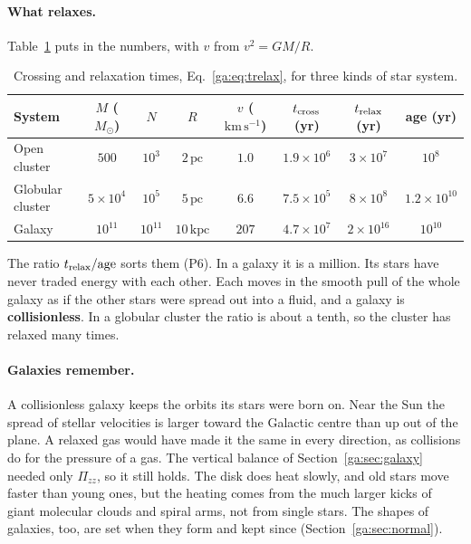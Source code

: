 \paragraph{What relaxes.} Table~\ref{ga:tab:relax} puts in the numbers, with $v$ from $v^2=GM/R$.
\begin{table}[htbp]
	\centering
	\begin{tabular}{@{}l c c c c c c c@{}}
		\toprule
		\textbf{System} & $M$ ($M_\odot$) & $N$ & $R$ & $v$ ($\mathrm{km\,s^{-1}}$) & $t_{\rm cross}$ (yr) & $t_{\rm relax}$ (yr) & age (yr) \\
		\midrule
		Open cluster & $500$ & $10^3$ & $2\,\mathrm{pc}$ & $1.0$ & $1.9\times10^6$ & $3\times10^7$ & $10^8$ \\
		Globular cluster & $5\times10^4$ & $10^5$ & $5\,\mathrm{pc}$ & $6.6$ & $7.5\times10^5$ & $8\times10^8$ & $1.2\times10^{10}$ \\
		Galaxy & $10^{11}$ & $10^{11}$ & $10\,\mathrm{kpc}$ & $207$ & $4.7\times10^7$ & $2\times10^{16}$ & $10^{10}$ \\
		\bottomrule
	\end{tabular}
	\caption{Crossing and relaxation times, Eq.~\eqref{ga:eq:trelax}, for three kinds of star system.}
	\label{ga:tab:relax}
\end{table}
The ratio $t_{\rm relax}/\text{age}$ sorts them (P6). In a galaxy it is a million. Its stars have never traded energy with each other. Each moves in the smooth pull of the whole galaxy as if the other stars were spread out into a fluid, and a galaxy is \textbf{collisionless}. In a globular cluster the ratio is about a tenth, so the cluster has relaxed many times.

\paragraph{Galaxies remember.} A collisionless galaxy keeps the orbits its stars were born on. Near the Sun the spread of stellar velocities is larger toward the Galactic centre than up out of the plane. A relaxed gas would have made it the same in every direction, as collisions do for the pressure of a gas. The vertical balance of Section~\ref{ga:sec:galaxy} needed only $\Pi_{zz}$, so it still holds. The disk does heat slowly, and old stars move faster than young ones, but the heating comes from the much larger kicks of giant molecular clouds and spiral arms, not from single stars. The shapes of galaxies, too, are set when they form and kept since (Section~\ref{ga:sec:normal}).

